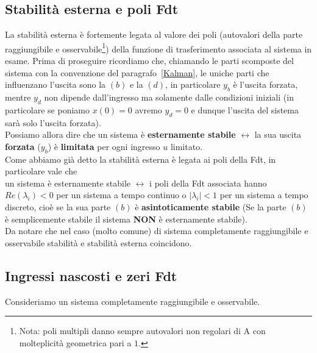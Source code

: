 \documentclass[a4paper]{article}
\begin{document}
	\subsection{Stabilità esterna e poli Fdt}
	La stabilità esterna è fortemente legata al valore dei poli (autovalori della parte raggiungibile e osservabile\footnote{Nota: poli multipli danno sempre autovalori non regolari di A con molteplicità geometrica pari a $1$.}) della funzione di trasferimento associata al sistema in esame. Prima di proseguire ricordiamo che, chiamando le parti scomposte del sistema con la convenzione del paragrafo~\ref{Kalman}, le uniche parti che influenzano l'uscita sono la $(b)$ e la $(d)$, in particolare $y_b$ è l'uscita forzata, mentre $y_d$ non dipende dall'ingresso ma solamente dalle condizioni iniziali (in particolare se poniamo $x(0)=0$ avremo $y_d=0$ e dunque l'uscita del sistema sarà solo l'uscita forzata). 
	\newline \\
	Possiamo allora dire che un sistema è \textbf{esternamente stabile} $\leftrightarrow$ la sua uscita  \textbf{forzata} ($y_b$) è \textbf{limitata} per ogni ingresso $u$ limitato.
	\newline \\
	Come abbiamo già detto la stabilità esterna è legata ai poli della Fdt, in particolare vale che
	\newline \\
	un sistema è esternamente stabile $\leftrightarrow$ i poli della Fdt associata hanno $Re(\lambda_i)<0$ per un sistema a tempo continuo o $|\lambda_i|<1$ per un sistema a tempo discreto, cioè se la sua parte $(b)$ è \textbf{asintoticamente stabile} (Se la parte $(b)$ è semplicemente stabile il sistema \textbf{NON} è esternamente stabile).
	\newline \\
	Da notare che nel caso (molto comune) di sistema completamente raggiungibile e osservabile stabilità e stabilità esterna coincidono.
	
	
	\subsection{Ingressi nascosti e zeri Fdt}
	Consideriamo un sistema completamente raggiungibile e osservabile.
	
\end{document}

